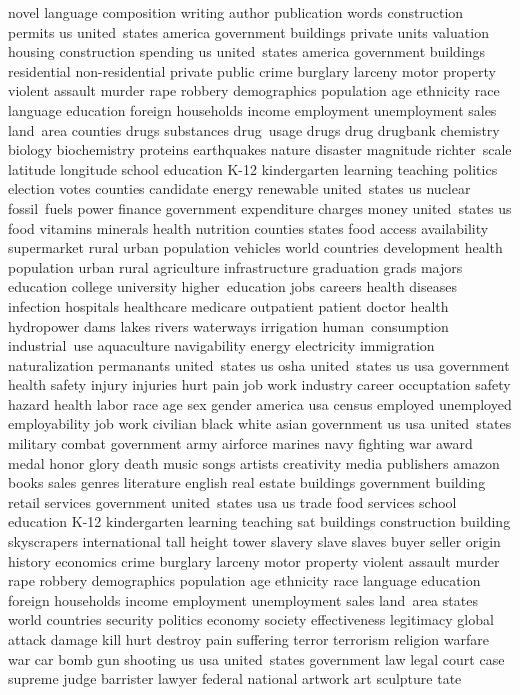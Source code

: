 novel
language
composition
writing
author
publication
words
construction
permits
us
united~states
america
government
buildings
private
units
valuation
housing
construction
spending
us
united~states
america
government
buildings
residential
non-residential
private
public
crime
burglary
larceny
motor
property
violent
assault
murder
rape
robbery
demographics
population
age
ethnicity
race
language
education
foreign
households
income
employment
unemployment
sales
land~area
counties
drugs
substances
drug~usage
drugs
drug
drugbank
chemistry
biology
biochemistry
proteins
earthquakes
nature
disaster
magnitude
richter~scale
latitude
longitude
school
education
K-12
kindergarten
learning
teaching
politics
election
votes
counties
candidate
energy
renewable
united~states
us
nuclear
fossil~fuels
power
finance
government
expenditure
charges
money
united~states
us
food
vitamins
minerals
health
nutrition
counties
states
food
access
availability
supermarket
rural
urban
population
vehicles
world
countries
development
health
population
urban
rural
agriculture
infrastructure
graduation
grads
majors
education
college
university
higher~education
jobs
careers
health
diseases
infection
hospitals
healthcare
medicare
outpatient
patient
doctor
health
hydropower
dams
lakes
rivers
waterways
irrigation
human~consumption
industrial~use
aquaculture
navigability
energy
electricity
immigration
naturalization
permanants
united~states
us
osha
united~states
us
usa
government
health
safety
injury
injuries
hurt
pain
job
work
industry
career
occuptation
safety
hazard
health
labor
race
age
sex
gender
america
usa
census
employed
unemployed
employability
job
work
civilian
black
white
asian
government
us
usa
united~states
military
combat
government
army
airforce
marines
navy
fighting
war
award
medal
honor
glory
death
music
songs
artists
creativity
media
publishers
amazon
books
sales
genres
literature
english
real
estate
buildings
government
building
retail
services
government
united~states
usa
us
trade
food
services
school
education
K-12
kindergarten
learning
teaching
sat
buildings
construction
building
skyscrapers
international
tall
height
tower
slavery
slave
slaves
buyer
seller
origin
history
economics
crime
burglary
larceny
motor
property
violent
assault
murder
rape
robbery
demographics
population
age
ethnicity
race
language
education
foreign
households
income
employment
unemployment
sales
land~area
states
world
countries
security
politics
economy
society
effectiveness
legitimacy
global
attack
damage
kill
hurt
destroy
pain
suffering
terror
terrorism
religion
warfare
war
car
bomb
gun
shooting
us
usa
united~states
government
law
legal
court
case
supreme
judge
barrister
lawyer
federal
national
artwork
art
sculpture
tate

